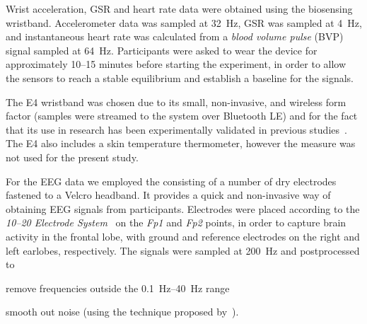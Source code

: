 \documentclass[10pt,letterpaper]{article}
\providecommand{\DIFaddtex}[1]{#1} %
\providecommand{\DIFdeltex}[1]{} %
\providecommand{\DIFaddbegin}{\protect\color{blue}} %
\providecommand{\DIFaddend}{\protect\color{black}} %
\providecommand{\DIFdelbegin}{\protect\color{red}} %
\providecommand{\DIFdelend}{\protect\color{black}} %
\providecommand{\DIFadd}[1]{\texorpdfstring{\DIFaddtex{#1}}{#1}} %
\providecommand{\DIFdel}[1]{\texorpdfstring{\DIFdeltex{#1}}{}} %
\newcommand{\DIFscaledelfig}{0.5}
\newlength{\DIFdelgraphicswidth} %
\newlength{\DIFdelgraphicsheight} %
\newcommand{\DIFaddincludegraphics}[2][]{{\color{blue}\fbox{\DIFOincludegraphics[#1]{#2}}}} %
\newcommand{\DIFdelincludegraphics}[2][]{%
\sbox{\DIFdelgraphicsbox}{\DIFOincludegraphics[#1]{#2}}%
\settoboxwidth{\DIFdelgraphicswidth}{\DIFdelgraphicsbox} %
\settoboxtotalheight{\DIFdelgraphicsheight}{\DIFdelgraphicsbox} %
\scalebox{\DIFscaledelfig}{%
\parbox[b]{\DIFdelgraphicswidth}{\usebox{\DIFdelgraphicsbox}\\[-\baselineskip] \rule{\DIFdelgraphicswidth}{0em}}\llap{\resizebox{\DIFdelgraphicswidth}{\DIFdelgraphicsheight}{%
\setlength{\unitlength}{\DIFdelgraphicswidth}%
\begin{picture}(1,1)%
\thicklines\linethickness{2pt} %
{\color[rgb]{1,0,0}\put(0,0){\framebox(1,1){}}}%
{\color[rgb]{1,0,0}\put(0,0){\line( 1,1){1}}}%
{\color[rgb]{1,0,0}\put(0,1){\line(1,-1){1}}}%
\end{picture}%
}\hspace*{3pt}}} %
} %
\DeclareRobustCommand{\DIFaddbegin}{\DIFOaddbegin \let\includegraphics\DIFaddincludegraphics} %
\DeclareRobustCommand{\DIFaddend}{\DIFOaddend \let\includegraphics\DIFOincludegraphics} %
\DeclareRobustCommand{\DIFdelbegin}{\DIFOdelbegin \let\includegraphics\DIFdelincludegraphics} %
\DeclareRobustCommand{\DIFdelend}{\DIFOaddend \let\includegraphics\DIFOincludegraphics} %
\begin{document}
Wrist acceleration, GSR and heart rate data were obtained using the \textcite{empatica:e4} biosensing wristband.
Accelerometer data was sampled at \SI{32}{\hertz},
GSR was sampled at \SI{4}{\hertz}, and instantaneous heart rate was calculated from a \emph{blood volume pulse} (BVP) signal sampled at \SI{64}{\hertz}.
Participants were asked to wear the device for approximately 10--15 minutes before starting the experiment, in order to allow the sensors to reach \DIFdelbegin \DIFdel{an }\DIFdelend \DIFaddbegin \DIFadd{a }\DIFaddend stable equilibrium and establish a baseline for the signals.

The E4 wristband was chosen due to its small, non-invasive\DIFaddbegin \DIFadd{, }\DIFaddend and wireless form factor (samples were streamed to the system over Bluetooth LE) and for the fact that its use in research has been experimentally validated in previous \DIFdelbegin \DIFdel{research}\DIFdelend \DIFaddbegin \DIFadd{studies}\DIFaddend ~\autocite{ragot2017emotion, mccarthy2016validation}.
The E4 also includes a skin temperature thermometer\DIFdelbegin \DIFdel{; however, due to failure to reach equilibrium, }\DIFdelend \DIFaddbegin \DIFadd{, however }\DIFaddend the measure was not used for the present study.

For the EEG data we employed the \textcite{openbci:headbandkit} \DIFdelbegin \DIFdel{, a kit }\DIFdelend consisting of a number of dry electrodes fastened to a Velcro headband.
It \DIFdelbegin \DIFdel{thus }\DIFdelend provides a quick \DIFdelbegin \DIFdel{, easy }\DIFdelend and non-invasive way of obtaining EEG signals from participants.
Electrodes were placed according to the \emph{10--20 Electrode System}~\autocite{eeg1020system:1961} on the \emph{Fp1} and \emph{Fp2} points, in order to capture brain activity in the frontal lobe\DIFdelbegin \DIFdel{.
Ground }\DIFdelend \DIFaddbegin \DIFadd{, with ground }\DIFaddend and reference electrodes \DIFdelbegin \DIFdel{were positioned }\DIFdelend on the right and left earlobes\DIFaddbegin \DIFadd{, respectively.
The signals }\DIFaddend were sampled at \SI{200}{\hertz} and \DIFaddbegin \DIFadd{postprocessed to 
}\begin{enumerate*}[itemjoin={{, }},
                  itemjoin*={{, and }},
                  label={{(\arabic*)}}]
  \item remove frequencies outside the \SIrange{0.1}{40}{\hertz} range
  \item smooth out noise (using the technique proposed by~\textcite{agarwal2017eeg}).
\end{enumerate*}
\DIFaddend 
\end{document}
